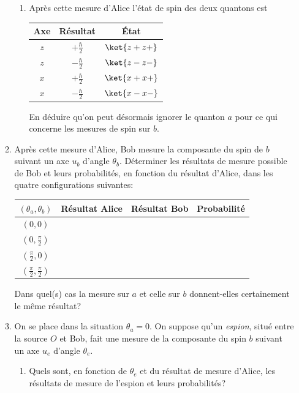 \begin{enumerate}
\begin{enumerate}
\begin{enumerate}
\item Après cette mesure d'Alice l'état de spin des deux quantons est
\begin{center}
\begin{tabular}{|c|c|c|}\hline
Axe & Résultat & État\\\hline
$z$ & $+\frac{\hbar}{2}$ & $\ket{z+z+}$\\\hline
$z$ & $-\frac{\hbar}{2}$ & $\ket{z-z-}$\\\hline
$x$ & $+\frac{\hbar}{2}$ & $\ket{x+x+}$\\\hline
$x$ & $-\frac{\hbar}{2}$ & $\ket{x-x-}$\\\hline
 \end{tabular}
 \end{center}
En déduire qu'on peut désormais ignorer le quanton $a$ pour ce qui concerne les
mesures de spin sur $b$.
\end{enumerate}

\item Après cette mesure d'Alice, Bob mesure la composante du spin de $b$
suivant un axe $u_b$ d'angle $\theta_b$. Déterminer les résultats de
mesure possible de Bob et leurs probabilités, en fonction du résultat d'Alice,
dans les quatre configurations suivantes:
\begin{center}
\begin{tabular}{|c|c|c|c|}\hline
$(\theta_a,\theta_b)$ & Résultat Alice & Résultat Bob & Probabilité\\\hline
$(0,0)$ &  & &\\\hline
$(0,\frac{\pi}{2})$ &  & &\\\hline
$(\frac{\pi}{2},0)$ &  & &\\\hline
$(\frac{\pi}{2},\frac{\pi}{2})$ &  & &\\\hline
 \end{tabular}
 \end{center}
Dans quel(s) cas la mesure sur $a$ et celle sur $b$ donnent-elles certainement 
le même résultat?

\item On se place dans la situation $\theta_a=0$. On suppose qu'un
\emph{espion}, situé entre la source $O$ et Bob, fait une mesure de la
composante du spin $b$ suivant un axe $u_e$ d'angle $\theta_e$.

\begin{enumerate}
 \item Quels sont, en fonction de $\theta_e$ et du résultat de mesure d'Alice,
les résultats de mesure de l'espion et leurs probabilités?


\end{enumerate}
\end{enumerate}
\end{enumerate}
